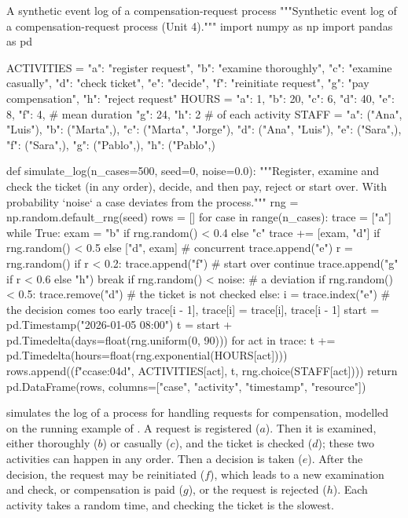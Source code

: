 \begin{pylisting}[label={lst:eventlog}]{A synthetic event log of a compensation-request process}
"""Synthetic event log of a compensation-request process (Unit 4)."""
import numpy as np
import pandas as pd

ACTIVITIES = {"a": "register request", "b": "examine thoroughly",
              "c": "examine casually", "d": "check ticket", "e": "decide",
              "f": "reinitiate request", "g": "pay compensation", "h": "reject request"}
HOURS = {"a": 1, "b": 20, "c": 6, "d": 40, "e": 8, "f": 4,     # mean duration
         "g": 24, "h": 2}                                       # of each activity
STAFF = {"a": ("Ana", "Luis"), "b": ("Marta",), "c": ("Marta", "Jorge"),
         "d": ("Ana", "Luis"), "e": ("Sara",), "f": ("Sara",), "g": ("Pablo",),
         "h": ("Pablo",)}

def simulate_log(n_cases=500, seed=0, noise=0.0):
    """Register, examine and check the ticket (in any order), decide, and then pay,
    reject or start over. With probability `noise` a case deviates from the process."""
    rng = np.random.default_rng(seed)
    rows = []
    for case in range(n_cases):
        trace = ["a"]
        while True:
            exam = "b" if rng.random() < 0.4 else "c"
            trace += [exam, "d"] if rng.random() < 0.5 else ["d", exam]   # concurrent
            trace.append("e")
            r = rng.random()
            if r < 0.2:
                trace.append("f")                      # start over
                continue
            trace.append("g" if r < 0.6 else "h")
            break
        if rng.random() < noise:                       # a deviation
            if rng.random() < 0.5:
                trace.remove("d")                      # the ticket is not checked
            else:
                i = trace.index("e")                   # the decision comes too early
                trace[i - 1], trace[i] = trace[i], trace[i - 1]
        start = pd.Timestamp("2026-01-05 08:00")
        t = start + pd.Timedelta(days=float(rng.uniform(0, 90)))
        for act in trace:
            t += pd.Timedelta(hours=float(rng.exponential(HOURS[act])))
            rows.append((f"c{case:04d}", ACTIVITIES[act], t, rng.choice(STAFF[act])))
    return pd.DataFrame(rows, columns=["case", "activity", "timestamp", "resource"])
\end{pylisting}

 simulates the log of a process for handling requests for compensation, modelled on
the running example of \citet{vanderaalst2016process}. A request is registered ($a$). Then it is examined,
either thoroughly ($b$) or casually ($c$), and the ticket is checked ($d$); these two activities can happen in any order. Then a
decision is taken ($e$). After the decision, the request may be reinitiated ($f$), which leads to a new
examination and check, or compensation is paid ($g$), or the request is rejected ($h$). Each activity takes a
random time, and checking the ticket is the slowest.

